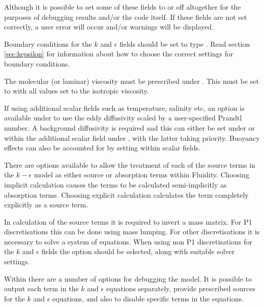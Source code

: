 Although it is possible to set some of these fields to  or off
altogether for the purposes of debugging results and/or the code itself. If these fields
are not set correctly, a user error will occur and/or warnings will be displayed.

Boundary conditions for the $k$ and $\epsilon$ fields should be set to type
. Read section \ref{sec:kepsilon} for information about how to choose
the correct settings for boundary conditions.

The molecular (or laminar) viscosity must be prescribed under
. This must be set to
 with all values set
to the isotropic viscosity.

If using additional scalar fields such as temperature, salinity etc, an option is
available under  to use the eddy
diffusivity scaled by a user-specified Prandtl number. A background diffusivity is
required and this can either be set under
 or within the additional
scalar field under
, with
the latter taking priority. Buoyancy effects can also be accounted for by setting
 within scalar
fields.

There are options available to allow the treatment of each of the source terms in the
$k-\epsilon$ model as either source or absorption terms within Fluidity. Choosing implicit
calculation causes the terms to be calculated semi-implicitly as absorption
terms. Choosing explicit calculation calculates the term completely explicitly as a source
term.

In calculation of the source terms it is required to invert a mass matrix. For P1
discretisations this can be done using mass lumping. For other discretisations it is
necessary to solve a system of equations. When using non P1 discretisations for the $k$
and $\epsilon$ fields the option
 should
be selected, along with suitable solver settings.

Within  there are a number of options for
debugging the model. It is possible to output each term in the $k$ and $\epsilon$
equations separately, provide prescribed sources for the $k$ and $\epsilon$ equations, and
also to disable specific terms in the equations.

